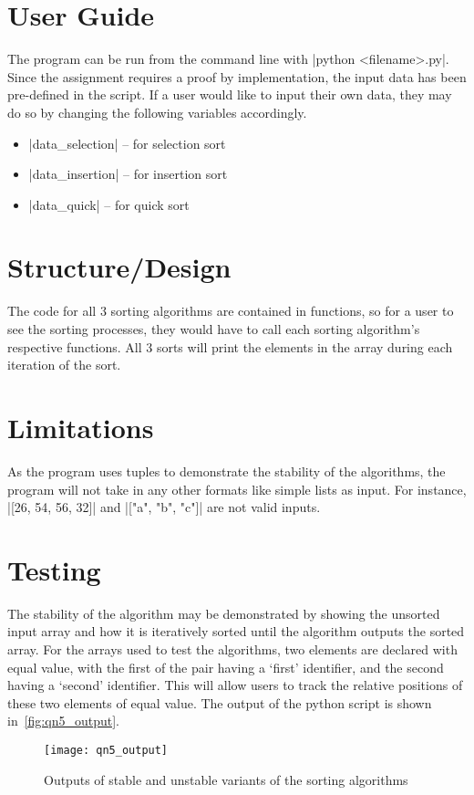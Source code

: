 \documentclass{report}
\begin{document}
\section{User Guide}
The program can be run from the command line with |python <filename>.py|. Since the assignment requires a proof by implementation, the input data has been pre-defined in the script. If a user would like to input their own data, they may do so by changing the following variables accordingly.
\begin{itemize}
	\item |data_selection| -- for selection sort
	\item |data_insertion| -- for insertion sort
	\item |data_quick| -- for quick sort
\end{itemize}
\section{Structure/Design}
The code for all 3 sorting algorithms are contained in functions, so for a user to see the sorting processes, they would have to call each sorting algorithm's respective functions. All 3 sorts will print the elements in the array during each iteration of the sort.
\section{Limitations}
As the program uses tuples to demonstrate the stability of the algorithms, the program will not take in any other formats like simple lists as input. For instance, |[26, 54, 56, 32]| and |["a", "b", "c"]| are not valid inputs.
\section{Testing}
The stability of the algorithm may be demonstrated by showing the unsorted input array and how it is iteratively sorted until the algorithm outputs the sorted array. For the arrays used to test the algorithms, two elements are declared with equal value, with the first of the pair having a `first' identifier, and the second having a `second' identifier. This will allow users to track the relative positions of these two elements of equal value. The output of the python script is shown in~\autoref{fig:qn5_output}.
\begin{figure}[H]
	\centering
	\caption{Outputs of stable and unstable variants of the sorting algorithms}
	\texttt{[image: qn5\_output]}
	\label{fig:qn5_output}
\end{figure}
\end{document}
